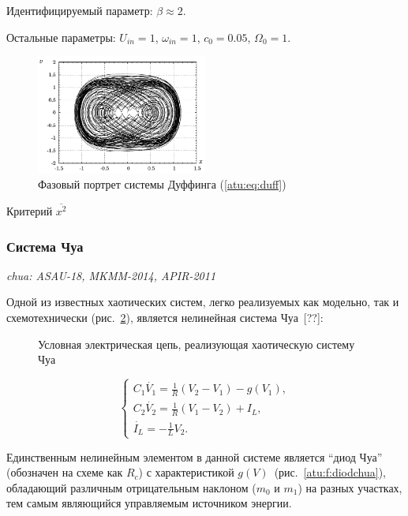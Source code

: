 \documentclass[a4paper,12pt]{article}
\newcommand{\LinkRef}[1]{ \textit{#1} }
\begin{document}
Идентифицируемый параметр:
$ \beta \approx 2 $.

Остальные параметры:
\(U_{in}=1\), \(\omega_{in}=1\),
\(c_0 = 0.05\), \( \Omega_0 = 1 \).

\begin{figure}[htb!]
\centerline{\includegraphics[width=0.5\textwidth]{p/cha/duff_phase.pdf} }
\caption{Фазовый портрет системы Дуффинга (\ref{atu:eq:duff})}
\label{atu:f:duff_phase}
\end{figure}

Критерий
$\overline{x^2}$




\FloatBarrier
\subsubsection{Система Чуа} %

\LinkRef{
 chua: ASAU-18, MKMM-2014, APIR-2011
}

Одной из известных хаотических систем, легко реализуемых как модельно,
так и схемотехнически (рис.~\ref{atu:f:chuascheme}),
является нелинейная система Чуа~[??]:

\begin{figure}[htb!]
\begin{center}

\end{center}
\caption{Условная электрическая цепь, реализующая хаотическую систему Чуа}
\label{atu:f:chuascheme}
\end{figure}


\begin{equation}
\begin{cases}
  C_1 \dot{V_1}  = \frac{1}{R} ( V_2 - V_1 ) - g(V_1), \\
  C_2 \dot{V_2}  = \frac{1}{R} ( V_1 - V_2 ) + I_L, \\
  \dot{I_L}      = - \frac{1}{L} V_2 .
\end{cases}
\label{atu:eq:chua}
\end{equation}

Единственным нелинейным элементом в данной системе является ``диод Чуа''
(обозначен на схеме как $R_c$) с
характеристикой $g(V)$~(рис.~\ref{atu:f:diodchua}),
обладающий различным отрицательным наклоном
($m_0$ и $m_1$) на разных участках,
тем самым являющийся управляемым источником энергии.
\end{document}
